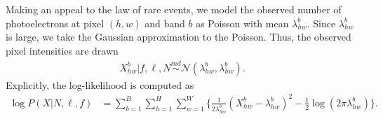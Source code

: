 Making an appeal to the law of rare events, we model the
observed number of photoelectrons at pixel $(h,w)$ and band $b$ as Poisson
with mean $\lambda^b_{hw}$. Since $\lambda^b_{hw}$ is large,
we take the Gaussian approximation to the Poisson.
Thus, the observed pixel intensities are drawn
\begin{align}
  X_{hw}^b | f, \ell, N \overset{ind}{\sim} \mathcal{N}(\lambda^b_{hw}, \lambda^b_{hw}).
\end{align}
Explicitly, the log-likelihood is computed as 
\begin{align}
    \log P(X | N, \ell, f) &= \sum_{b = 1}^{B} \sum_{h = 1}^H \sum_{w = 1}^W 
        \Big\{\frac{1}{2\lambda^b_{hw}}(X_{hw}^b  - \lambda^b_{hw})^2 - 
               \frac{1}{2}\log(2\pi\lambda^b_{hw})\Big\}
    \label{eq:loglik}.
\end{align}